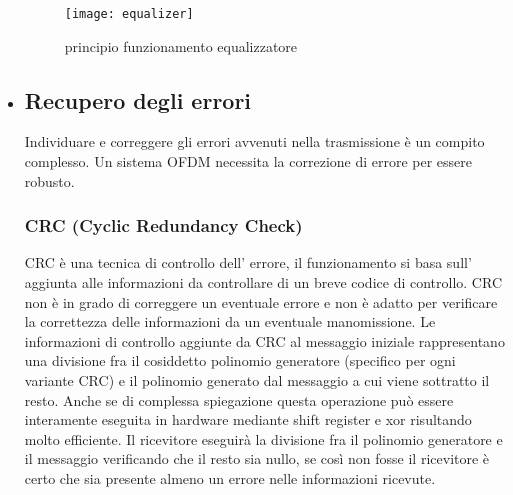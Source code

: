\begin{itemize}
     \begin{figure}[h]
     	\centering
     	\texttt{[image: equalizer]}
     	\caption{principio funzionamento equalizzatore \cite{equalizer}}\label{fig:1}
     \end{figure}
 \item \subsection{Recupero degli errori} Individuare e correggere gli errori avvenuti nella trasmissione è un compito complesso. Un sistema OFDM necessita la correzione di errore per essere robusto.
 \subsubsection{CRC (Cyclic Redundancy Check)}
 CRC è una tecnica di controllo dell' errore, il funzionamento si basa sull' aggiunta alle informazioni da controllare di un breve codice di controllo. CRC non è in grado di correggere un eventuale errore e non è adatto per verificare la correttezza delle informazioni da un eventuale manomissione. Le informazioni di controllo aggiunte da CRC al messaggio iniziale rappresentano una divisione fra il cosiddetto polinomio generatore (specifico per ogni variante CRC) e il polinomio generato dal messaggio a cui viene sottratto il resto. Anche se di complessa spiegazione questa operazione può essere interamente eseguita in hardware mediante shift register e xor  risultando molto efficiente. Il ricevitore eseguirà la divisione fra il polinomio generatore e il messaggio verificando che il resto sia nullo, se così non fosse il ricevitore è certo che sia presente almeno un errore nelle informazioni ricevute. \cite{crc}
 

\end{itemize}
